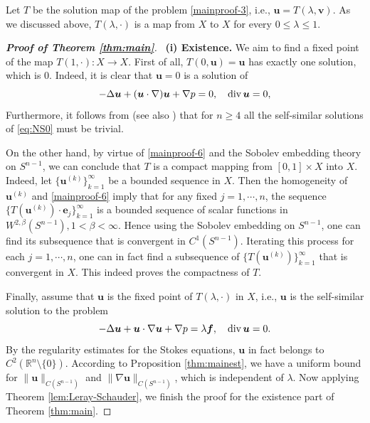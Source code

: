 \documentclass[12pt]{amsart}
\renewcommand{\div}{{\rm div \thinspace }}
\newcommand{\Bv}{{\boldsymbol{v}}}
\newcommand{\Bu}{{\boldsymbol{u}}}
\newcommand{\Be}{{\boldsymbol{e}}}
\newcommand{\Bf}{{\boldsymbol{f}}}
\begin{document}
Let $T$ be the solution map of the problem \eqref{mainproof-3}, i.e., $\Bu = T(\lambda, \Bv)$. As we discussed above, $T(\lambda, \cdot)$ is a map from $X$ to $X$ for every $0\leq \lambda \leq 1$. 


\begin{proof}[{\bf Proof of Theorem \ref{thm:main}}]  
	\    {\bf {(i) Existence.}} We aim to find a fixed point of the map $T(1, \cdot): X \to X$. First of all, $T(0,\Bu)=\Bu$ has exactly one solution, which is 0. Indeed, it is clear that $\Bu=0$ is a solution of 
	\begin{equation}\label{eq:NS0}
		-\Delta \Bu + (\Bu \cdot \nabla )\Bu +\nabla p =0, \ \ \ \div \Bu =0, 
	\end{equation}
	Furthermore, it follows from \cite{Tsai98, Sverak11} (see also \cite{bang2023rigidity}) that for $n\geq 4$  all the self-similar solutions of \eqref{eq:NS0} must be trivial.
	
	On the other hand, by virtue of \eqref{mainproof-6} and the Sobolev embedding theory on $S^{n-1}$, we can conclude that $T$ is a compact mapping from $ [0, 1]\times X$ into $X$.
	{
		Indeed, let $\{\Bu^{(k)}\}_{k=1}^{\infty}$
		be a bounded sequence in $X$. Then the homogeneity of $\Bu^{(k)}$ and \eqref{mainproof-6} imply that for any fixed $j=1,\cdots,n$, the sequence $\{T(\Bu^{(k)})\cdot \Be_j \}_{k=1}^\infty $ is a bounded sequence of scalar functions in $W^{2,\beta }(S^{n-1}), 1<\beta<\infty$. Hence using the Sobolev embedding on $S^{n-1}$, one can find its subsequence that is convergent in $C^1(S^{n-1})$. Iterating  this process for each $j=1,\cdots,n$, one can in fact find a subsequence of $\{T(\Bu^{(k)})\}_{k=1}^{\infty}$ that is convergent in $X$. This indeed proves the compactness of $T.$
	}
	
	Finally, assume that $\Bu$ is the fixed point of $T(\lambda, \cdot)$ in $X$, i.e., $\Bu$ is the self-similar solution to the problem 
	\begin{equation*}
		-\Delta \Bu  + \Bu \cdot \nabla \Bu+ \nabla p= \lambda \Bf, \quad \div \Bu=0.
	\end{equation*}
	{By the regularity estimates for the Stokes equations, $\Bu$ in fact belongs to $C^2(\mathbb{R}^n \setminus \{0\})$.} According to Proposition \ref{thm:mainest}, we have a uniform bound for $\|\Bu \|_{C(S^{n-1})}$ and $\|\nabla \Bu\|_{C(S^{n-1})}$, which is independent of $\lambda$. 
	Now applying Theorem \ref{lem:Leray-Schauder}, we finish the proof for the existence part of Theorem \ref{thm:main}. 
	

\end{proof}
\end{document}
